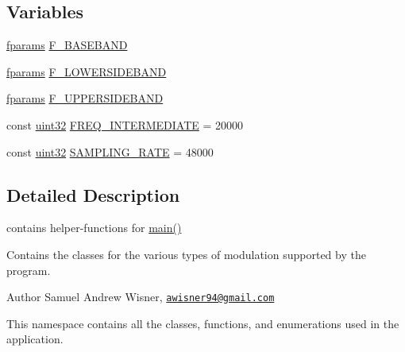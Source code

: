 \subsection*{Variables}
\begin{DoxyCompactItemize}
\item 
\hyperlink{definitions_8hpp_a7615684c2af56be5f302c5b367d71f6b}{fparams} \hyperlink{namespaceradio_a9bd902e9216499953a5906de73dc1796}{F\+\_\+\+B\+A\+S\+E\+B\+A\+N\+D}
\item 
\hyperlink{definitions_8hpp_a7615684c2af56be5f302c5b367d71f6b}{fparams} \hyperlink{namespaceradio_a0ffd57d5a11ff70a1f55dbdc8ebe098d}{F\+\_\+\+L\+O\+W\+E\+R\+S\+I\+D\+E\+B\+A\+N\+D}
\item 
\hyperlink{definitions_8hpp_a7615684c2af56be5f302c5b367d71f6b}{fparams} \hyperlink{namespaceradio_a0ec4548711b6d6ed6867c70b3fc2a413}{F\+\_\+\+U\+P\+P\+E\+R\+S\+I\+D\+E\+B\+A\+N\+D}
\item 
const \hyperlink{definitions_8hpp_a1134b580f8da4de94ca6b1de4d37975e}{uint32} \hyperlink{namespaceradio_aa82ddc6ba206798fd70ffc25665b3cb6}{F\+R\+E\+Q\+\_\+\+I\+N\+T\+E\+R\+M\+E\+D\+I\+A\+T\+E} = 20000
\item 
const \hyperlink{definitions_8hpp_a1134b580f8da4de94ca6b1de4d37975e}{uint32} \hyperlink{namespaceradio_a284213fea4beed2f74bb936927cbe654}{S\+A\+M\+P\+L\+I\+N\+G\+\_\+\+R\+A\+T\+E} = 48000
\end{DoxyCompactItemize}


\subsection{Detailed Description}
contains helper-\/functions for \hyperlink{alsa__test_8cpp_ae66f6b31b5ad750f1fe042a706a4e3d4}{main()} 

Contains the classes for the various types of modulation supported by the program.

\begin{DoxyAuthor}{Author}
Samuel Andrew Wisner, \href{mailto:awisner94@gmail.com}{\tt awisner94@gmail.\+com}
\end{DoxyAuthor}
This namespace contains all the classes, functions, and enumerations used in the application. 

